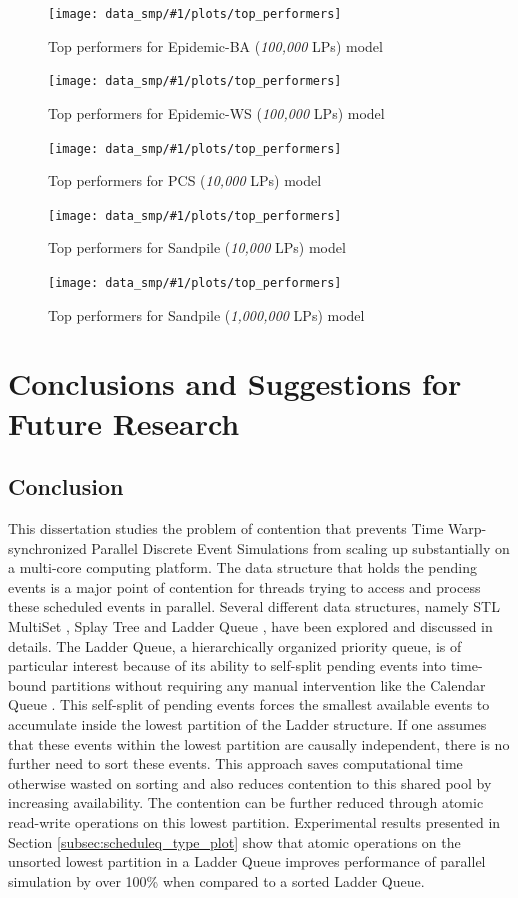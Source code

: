 \documentclass[11pt]{book}
\newcommand{\plotOverallSMP}[3]{
\begin{figure}
  \centerline{\texttt{[image: data\_smp/\#1/plots/top\_performers]}}
  \caption{#2}\label{#3}
\end{figure}
}
\begin{document}
\plotOverallSMP{epidemic_100k_ba}
               {Top performers for Epidemic-BA (\emph{100,000} LPs) model}
               {plot:epidemic_100k_ba:consolidated_smp}

\plotOverallSMP{epidemic_100k_ws}
               {Top performers for Epidemic-WS (\emph{100,000} LPs) model}
               {plot:epidemic_100k_ws:consolidated_smp}

\plotOverallSMP{pcs_10k}
               {Top performers for PCS (\emph{10,000} LPs) model}
               {plot:pcs_10k:consolidated_smp}

\plotOverallSMP{sandpile_10k}
               {Top performers for Sandpile (\emph{10,000} LPs) model}
               {plot:sandpile_10k:consolidated_smp}

\plotOverallSMP{sandpile_1m}
               {Top performers for Sandpile (\emph{1,000,000} LPs) model}
               {plot:sandpile_1m:consolidated_smp}



\chapter[Conclusion and Future Research]{Conclusions and Suggestions for Future Research}
\label{chapter:conclude}

\section{Conclusion}

This dissertation studies the problem of contention that prevents Time Warp-synchronized Parallel Discrete
Event Simulations from scaling up substantially on a multi-core computing platform.  The data structure that
holds the pending events is a major point of contention for threads trying to access and process these
scheduled events in parallel.  Several different data structures, namely STL MultiSet \cite{musser-89}, Splay
Tree \cite{sleator-85} and Ladder Queue \cite{tang-05}, have been explored and discussed in details.  The
Ladder Queue, a hierarchically organized priority queue, is of particular interest because of its ability to
self-split pending events into time-bound partitions without requiring any manual intervention like the
Calendar Queue \cite{brown-88}.  This self-split of pending events forces the smallest available events to
accumulate inside the lowest partition of the Ladder structure.  If one assumes that these events within the
lowest partition are causally independent, there is no further need to sort these events.  This approach saves
computational time otherwise wasted on sorting and also reduces contention to this shared pool by increasing
availability.  The contention can be further reduced through atomic read-write operations on this lowest
partition.  Experimental results presented in Section \ref{subsec:scheduleq_type_plot} show that atomic
operations on the unsorted lowest partition in a Ladder Queue improves performance of parallel simulation by
over 100\% when compared to a sorted Ladder Queue.
\end{document}

